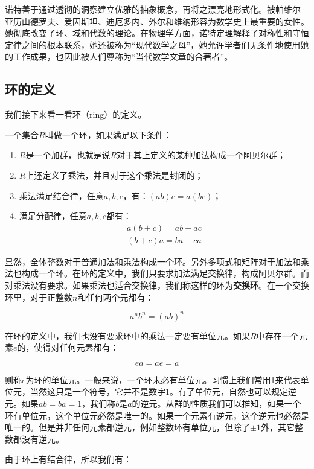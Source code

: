 \documentclass{article}
\begin{document}
诺特善于通过透彻的洞察建立优雅的抽象概念，再将之漂亮地形式化。被帕维尔·亚历山德罗夫、爱因斯坦、迪厄多内、外尔和维纳形容为数学史上最重要的女性。她彻底改变了环、域和代数的理论。在物理学方面，诺特定理解释了对称性和守恒定律之间的根本联系，她还被称为“现代数学之母”，她允许学者们无条件地使用她的工作成果，也因此被人们尊称为“当代数学文章的合著者”\cite{Wiki-Noether}。

\subsection{环的定义}
我们接下来看一看环（ring）的定义。

\begin{definition}
一个集合$R$叫做一个环，如果满足以下条件：
\begin{enumerate}
\item $R$是一个加群，也就是说$R$对于其上定义的某种加法构成一个阿贝尔群；
\item $R$上还定义了乘法，并且对于这个乘法是封闭的；
\item 乘法满足结合律，任意$a, b, c$，有：$(ab)c = a(bc)$；
\item 满足分配律，任意$a, b, c$都有：
\[
\begin{array}{l}
a(b + c) = ab + ac \\
(b + c)a = ba + ca
\end{array}
\]
\end{enumerate}
\end{definition}

显然，全体整数对于普通加法和乘法构成一个环。另外多项式和矩阵对于加法和乘法也构成一个环。在环的定义中，我们只要求加法满足交换律，构成阿贝尔群。而对乘法没有要求。如果乘法也适合交换律，我们称这样的环为\textbf{交换环}。在一个交换环里，对于正整数$n$和任何两个元都有：

\[
a^nb^n = (ab)^n
\]

在环的定义中，我们也没有要求环中的乘法一定要有单位元。如果$R$中存在一个元素$e$的，使得对任何元素都有：

\[
ea = ae = a
\]

则称$e$为环的单位元。一般来说，一个环未必有单位元。习惯上我们常用1来代表单位元，当然这只是一个符号，它并不是数字1。有了单位元，自然也可以规定逆元。如果$ab = ba = 1$，我们称$b$是$a$的逆元。从群的性质我们可以推知，如果一个环有单位元，这个单位元必然是唯一的。如果一个元素有逆元，这个逆元也必然是唯一的。但是并非任何元素都逆元，例如整数环有单位元，但除了$\pm 1$外，其它整数都没有逆元。

由于环上有结合律，所以我们有：
\end{document}
